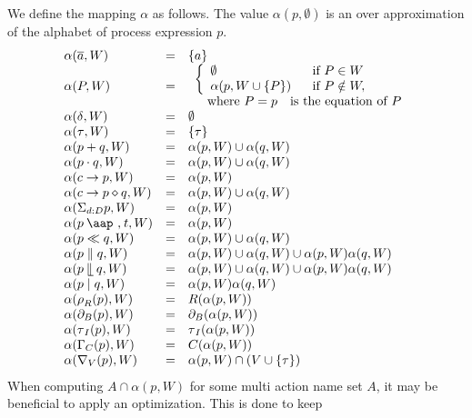 \documentclass{article}
\providecommand{\at}{\mathbin{\mbox{\aap ,}}}
\providecommand{\leftmerge}{\mathbin{\mathrel{\llfloor}}}
\begin{document}
We define the mapping $\alpha $ as follows. The value $\alpha (p,\emptyset )$
is an over approximation of the alphabet of process expression $p$.%
\[
\begin{array}{lll}
\alpha (\overline{a},W) & = & \{a\} \\ 
\alpha (P,W) & = & 
\begin{array}{l}
\left\{ 
\begin{array}{ll}
\emptyset & \text{if }P\in W \\ 
\alpha (p,W\cup \{P\}) & \text{if }P\notin W,%
\end{array}%
\right. \\ 
\text{ where }P=p\text{ is the equation of }P%
\end{array}
\\ 
\alpha (\delta ,W) & = & \emptyset \\ 
\alpha (\tau ,W) & = & \{\tau \} \\ 
\alpha (p+q,W) & = & \alpha (p,W)\cup \alpha (q,W) \\ 
\alpha (p\cdot q,W) & = & \alpha (p,W)\cup \alpha (q,W) \\ 
\alpha (c\rightarrow p,W) & = & \alpha (p,W) \\ 
\alpha (c\rightarrow p\diamond q,W) & = & \alpha (p,W)\cup \alpha (q,W) \\ 
\alpha (\Sigma _{d:D}p,W) & = & \alpha (p,W) \\ 
\alpha (p\at t,W) & = & \alpha (p,W) \\ 
\alpha (p\ll q,W) & = & \alpha (p,W)\cup \alpha (q,W) \\ 
\alpha (p\parallel q,W) & = & \alpha (p,W)\cup \alpha (q,W)\cup \alpha
(p,W)\alpha (q,W) \\ 
\alpha (p\leftmerge q,W) & = & \alpha (p,W)\cup \alpha (q,W)\cup \alpha
(p,W)\alpha (q,W) \\ 
\alpha (p\mid q,W) & = & \alpha (p,W)\alpha (q,W) \\ 
\alpha (\rho _{R}(p),W) & = & R(\alpha (p,W)) \\ 
\alpha (\partial _{B}(p),W) & = & \partial _{B}(\alpha (p,W)) \\ 
\alpha (\tau _{I}(p),W) & = & \tau _{I}(\alpha (p,W)) \\ 
\alpha (\Gamma _{C}(p),W) & = & C(\alpha (p,W)) \\ 
\alpha (\nabla _{V}(p),W) & = & \alpha (p,W)\cap (V\cup \{\tau \})%
\end{array}%
\]%
When computing $A\cap \alpha (p,W)$ for some multi action name set $A$, it
may be beneficial to apply an optimization. This is done to keep
\end{document}
